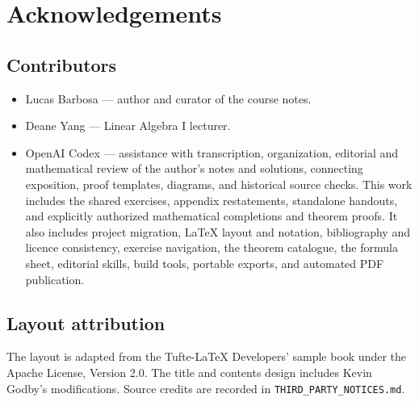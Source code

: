 \chapter*{Acknowledgements}

\section*{Contributors}

\begin{itemize}
  \item Lucas Barbosa --- author and curator of the course notes.
  \item Deane Yang --- Linear Algebra I lecturer.
  \item OpenAI Codex --- assistance with transcription, organization, editorial
    and mathematical review of the author's notes and solutions, connecting
    exposition, proof templates, diagrams, and historical source checks.
    This work includes the shared exercises, appendix restatements, standalone handouts, and
    explicitly authorized mathematical completions and theorem proofs.
    It also includes project
    migration, LaTeX layout and notation, bibliography and licence consistency,
    exercise navigation, the theorem catalogue, the formula sheet, editorial
    skills, build tools, portable exports, and automated PDF publication.
\end{itemize}

\section*{Layout attribution}

The layout is adapted from the Tufte-\LaTeX{} Developers' sample book under
the Apache License, Version 2.0. The title and contents design includes Kevin
Godby's modifications. Source credits are recorded in
\texttt{THIRD\_PARTY\_NOTICES.md}.
